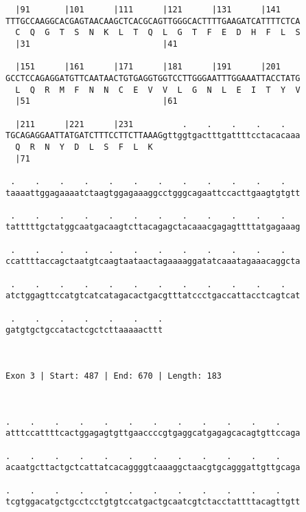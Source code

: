 \documentclass{article}
\begin{document}
\begin{Verbatim}
  |91       |101      |111      |121      |131      |141    
TTTGCCAAGGCACGAGTAACAAGCTCACGCAGTTGGGCACTTTTGAAGATCATTTTCTCA
  C  Q  G  T  S  N  K  L  T  Q  L  G  T  F  E  D  H  F  L  S
  |31                           |41                         
  
  |151      |161      |171      |181      |191      |201    
GCCTCCAGAGGATGTTCAATAACTGTGAGGTGGTCCTTGGGAATTTGGAAATTACCTATG
  L  Q  R  M  F  N  N  C  E  V  V  L  G  N  L  E  I  T  Y  V
  |51                           |61                         
  
  |211      |221      |231          .    .    .    .    .   
TGCAGAGGAATTATGATCTTTCCTTCTTAAAGgttggtgactttgattttcctacacaaa
  Q  R  N  Y  D  L  S  F  L  K                              
  |71                                                       
  
 .    .    .    .    .    .    .    .    .    .    .    .   
taaaattggagaaaatctaagtggagaaaggcctgggcagaattccacttgaagtgtgtt
                                                            
 .    .    .    .    .    .    .    .    .    .    .    .   
tatttttgctatggcaatgacaagtcttacagagctacaaacgagagttttatgagaaag
                                                            
 .    .    .    .    .    .    .    .    .    .    .    .   
ccattttaccagctaatgtcaagtaataactagaaaaggatatcaaatagaaacaggcta
                                                            
 .    .    .    .    .    .    .    .    .    .    .    .   
atctggagttccatgtcatcatagacactgacgtttatccctgaccattacctcagtcat
                                                            
 .    .    .    .    .    .    .
gatgtgctgccatactcgctcttaaaaacttt
                                
                                
 
Exon 3 | Start: 487 | End: 670 | Length: 183



.    .    .    .    .    .    .    .    .    .    .    .    
atttccattttcactggagagtgttgaaccccgtgaggcatgagagcacagtgttccaga
                                                            
.    .    .    .    .    .    .    .    .    .    .    .    
acaatgcttactgctcattatcacaggggtcaaaggctaacgtgcagggattgttgcaga
                                                            
.    .    .    .    .    .    .    .    .    .    .    .    
tcgtggacatgctgcctcctgtgtccatgactgcaatcgtctacctattttacagttgtt
                                                            

\end{Verbatim}
\end{document}
